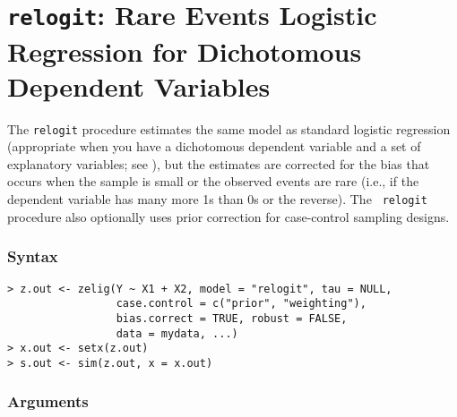 \section{{\tt relogit}: Rare Events Logistic Regression for
Dichotomous Dependent Variables}
\label{relogit}

The {\tt relogit} procedure estimates the same model as standard
logistic regression (appropriate when you have a dichotomous dependent
variable and a set of explanatory variables; see ), but
the estimates are corrected for the bias that occurs when the
sample is small or the observed events are rare (i.e., if the
dependent variable has many more 1s than 0s or the reverse).  The {\tt
  relogit} procedure also optionally uses prior correction for
case-control sampling designs.  

\subsubsection{Syntax}

\begin{verbatim}
> z.out <- zelig(Y ~ X1 + X2, model = "relogit", tau = NULL,
                 case.control = c("prior", "weighting"), 
                 bias.correct = TRUE, robust = FALSE, 
                 data = mydata, ...)
> x.out <- setx(z.out)
> s.out <- sim(z.out, x = x.out)
\end{verbatim}

\subsubsection{Arguments}

